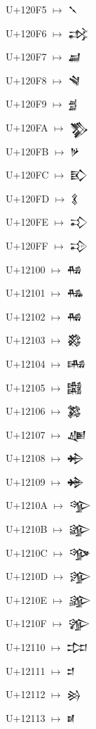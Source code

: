 {\noindent U+120F5  $\mapsto$ {\cufont 𒃵}\par
\noindent U+120F6  $\mapsto$ {\cufont 𒃶}\par
\noindent U+120F7  $\mapsto$ {\cufont 𒃷}\par
\noindent U+120F8  $\mapsto$ {\cufont 𒃸}\par
\noindent U+120F9  $\mapsto$ {\cufont 𒃹}\par
\noindent U+120FA  $\mapsto$ {\cufont 𒃺}\par
\noindent U+120FB  $\mapsto$ {\cufont 𒃻}\par
\noindent U+120FC  $\mapsto$ {\cufont 𒃼}\par
\noindent U+120FD  $\mapsto$ {\cufont 𒃽}\par
\noindent U+120FE  $\mapsto$ {\cufont 𒃾}\par
\noindent U+120FF  $\mapsto$ {\cufont 𒃿}\par
\noindent U+12100  $\mapsto$ {\cufont 𒄀}\par
\noindent U+12101  $\mapsto$ {\cufont 𒄁}\par
\noindent U+12102  $\mapsto$ {\cufont 𒄂}\par
\noindent U+12103  $\mapsto$ {\cufont 𒄃}\par
\noindent U+12104  $\mapsto$ {\cufont 𒄄}\par
\noindent U+12105  $\mapsto$ {\cufont 𒄅}\par
\noindent U+12106  $\mapsto$ {\cufont 𒄆}\par
\noindent U+12107  $\mapsto$ {\cufont 𒄇}\par
\noindent U+12108  $\mapsto$ {\cufont 𒄈}\par
\noindent U+12109  $\mapsto$ {\cufont 𒄉}\par
\noindent U+1210A  $\mapsto$ {\cufont 𒄊}\par
\noindent U+1210B  $\mapsto$ {\cufont 𒄋}\par
\noindent U+1210C  $\mapsto$ {\cufont 𒄌}\par
\noindent U+1210D  $\mapsto$ {\cufont 𒄍}\par
\noindent U+1210E  $\mapsto$ {\cufont 𒄎}\par
\noindent U+1210F  $\mapsto$ {\cufont 𒄏}\par
\noindent U+12110  $\mapsto$ {\cufont 𒄐}\par
\noindent U+12111  $\mapsto$ {\cufont 𒄑}\par
\noindent U+12112  $\mapsto$ {\cufont 𒄒}\par
\noindent U+12113  $\mapsto$ {\cufont 𒄓}\par
}
